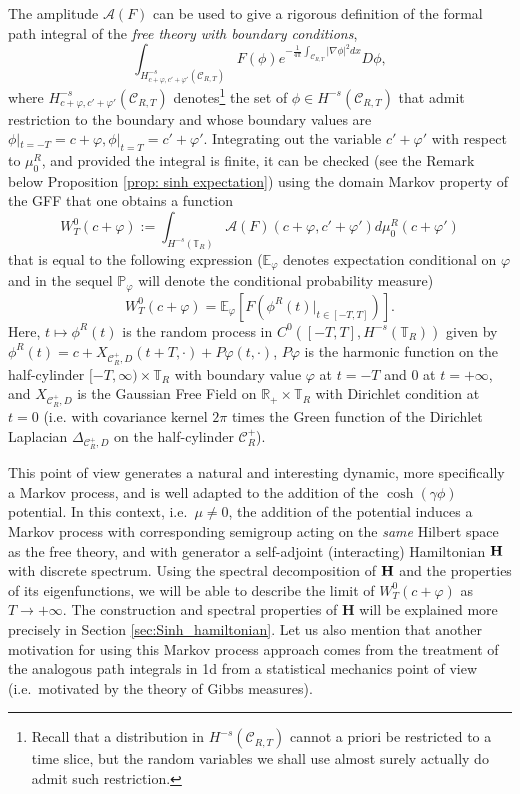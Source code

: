 \documentclass[11pt]{amsart}
\numberwithin{equation}{section}
\theoremstyle{definition}
\renewcommand{\H}{\mathbb{H}}
\newcommand{\R}{\mathbb{R}}
\def\H{\mathbf{H}}
\def\P{\mathbb{P}}
\def\E{\mathbb{E}}
\newcommand{\mc}{\mathcal}
\def\T{\mathbb{T}}
\begin{document}
The amplitude $\mc{A}(F)$ can be used to give a rigorous definition of the formal path integral of the \emph{free theory with boundary conditions}, 
\begin{equation}\label{double_conditioning} 
\int_{H_{c+\varphi,c'+\varphi'}^{-s}(\mc{C}_{R,T})} F(\phi) e^{-\frac{1}{4\pi} \int_{\mathcal{C}_{R,T}}|\nabla \phi|^2dx} D\phi,
\end{equation}
where $H_{c+\varphi,c'+\varphi'}^{-s}(\mc{C}_{R,T})$ denotes\footnote{Recall that a distribution in $H^{-s}(\mc{C}_{R,T})$ cannot a priori be restricted to a time slice, but the random variables we shall use almost surely actually do admit such restriction.} the set of $\phi\in H^{-s}(\mc{C}_{R,T})$ that admit restriction to the boundary and whose boundary 
values are $\phi|_{t=-T}=c+\varphi,\phi|_{t=T}=c'+\varphi'$.
Integrating out the variable $c'+\varphi'$ with respect to $\mu^R_0$, and provided the integral is finite, it can be checked (see the Remark below Proposition \ref{prop: sinh expectation}) using the domain Markov property of the  GFF  \cite[Theorem 1.52]{Berestycki_lqggff}  that one obtains a function 
\[ W^0_T(c+\varphi):=\int_{H^{-s}(\T_R)}\mc{A}(F)(c+\varphi, c'+\varphi')d\mu^R_0(c+\varphi')\] 
that is equal to the following expression ($\E_\varphi$ denotes expectation conditional on $\varphi$ and in the sequel $\P_\varphi$ will denote the conditional probability measure) 
\begin{equation}\label{W_T} 
W^0_T(c+\varphi)=\E_\varphi[ F(\phi^R(t)|_{t\in [-T,T]})].
\end{equation}
Here, $t\mapsto \phi^R(t)$ is the random process in $C^0([-T,T],H^{-s}(\T_R))$ given by 
$\phi^R(t)=c+X_{\mc{C}^+_{R},D}(t+T,\cdot)+P\varphi(t,\cdot)$, $P\varphi$ is the harmonic function 
on the half-cylinder $[-T,\infty)\times \T_R$ with boundary value $\varphi$ at $t=-T$ and $0$ at $t=+\infty$, and 
$X_{\mc{C}^+_{R},D}$ is the Gaussian Free Field on $\R_+ \times \T_R$ with Dirichlet condition at $t=0$ (i.e. with covariance kernel $2\pi$ times the Green function of the Dirichlet Laplacian  $\Delta_{{\mc{C}^+_{R},D}}$ on the half-cylinder $\mc{C}^+_{R}$). 

This point of view generates a natural and interesting dynamic, more specifically a Markov process, and is well adapted to the addition of the $\cosh(\gamma \phi)$ potential. In this context, i.e.\ $\mu \neq 0$, the addition of the potential induces a Markov process with corresponding semigroup acting on the \emph{same} Hilbert space as the free theory,  and with generator a self-adjoint (interacting) Hamiltonian ${\bf H}$ with discrete spectrum. Using the spectral decomposition of ${\bf H}$ and the properties of its eigenfunctions, we will be able to describe the limit of $W^0_T(c+\varphi)$ as $T\to +\infty$. The construction and spectral properties of $\H$ will be explained more precisely in Section \ref{sec:Sinh_hamiltonian}. Let us also mention that another motivation for using this Markov process approach comes from the treatment of the analogous path integrals in 1d \cite{OS99} from a statistical mechanics point of view (i.e.\ motivated by the theory of Gibbs measures). 
\end{document}
